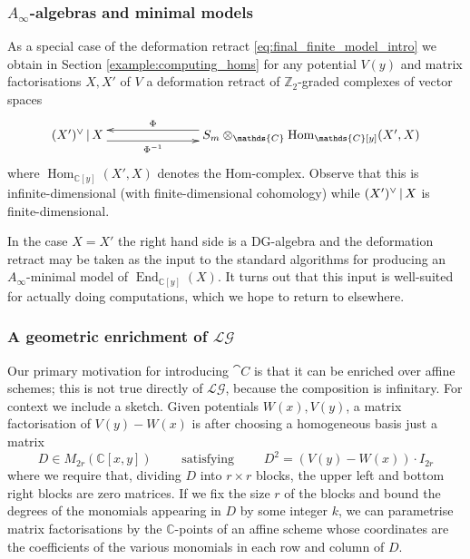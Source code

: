 \documentclass[english,letter paper,12pt,leqno]{article}
\theoremstyle{example}
\numberwithin{equation}{section}
\def\LG{\mathcal{LG}}
\def\Hom{\operatorname{Hom}}
\def\be{\begin{equation}}
\def\ee{\end{equation}}
\def\nZ{\mathds{Z}}
\def\nC{\mathds{C}}
\DeclareMathOperator{\End}{End}
\begin{document}
\subsubsection{$A_\infty$-algebras and minimal models}

As a special case of the deformation retract \eqref{eq:final_finite_model_intro} we obtain in Section \ref{example:computing_homs} for any potential $V(y)$ and matrix factorisations $X,X'$ of $V$ a deformation retract of $\nZ_2$-graded complexes of vector spaces
\begin{equation}\label{eq:final_finite_model_hom}
\xymatrix@C+4pc{
(X')^{\vee} \l X \ar@<-1ex>[r]_-{\Phi^{-1}} & S_m \otimes_{\nC} \Hom_{\nC[y]}(X', X) \ar@<-1ex>[l]_-{\Phi}
}
\end{equation}
where $\Hom_{\nC[y]}(X',X)$ denotes the Hom-complex. Observe that this is infinite-dimensional (with finite-dimensional cohomology) while $(X')^{\vee} \,|\, X$ is finite-dimensional.

In the case $X = X'$ the right hand side is a DG-algebra and the deformation retract may be taken as the input to the standard algorithms for producing an $A_\infty$-minimal model of $\End_{\nC[y]}(X)$. It turns out that this input is well-suited for actually doing computations, which we hope to return to elsewhere.

\subsubsection{A geometric enrichment of $\LG$}

Our primary motivation for introducing $\cat{C}$ is that it can be enriched over affine schemes; this is not true directly of $\LG$, because the composition is infinitary. For context we include a sketch. Given potentials $W(x), V(y)$, a matrix factorisation of $V(y) - W(x)$ is after choosing a homogeneous basis just a matrix
\be\label{eq:intro_capitalD}
D \in M_{2r}( \nC[x,y] ) \qquad \text{ satisfying } \qquad D^2 = (V(y) - W(x)) \cdot I_{2r}
\ee
where we require that, dividing $D$ into $r \times r$ blocks, the upper left and bottom right blocks are zero matrices. If we fix the size $r$ of the blocks and bound the degrees of the monomials appearing in $D$ by some integer $k$, we can parametrise matrix factorisations by the $\nC$-points of an affine scheme whose coordinates are the coefficients of the various monomials in each row and column of $D$. 
\end{document}
